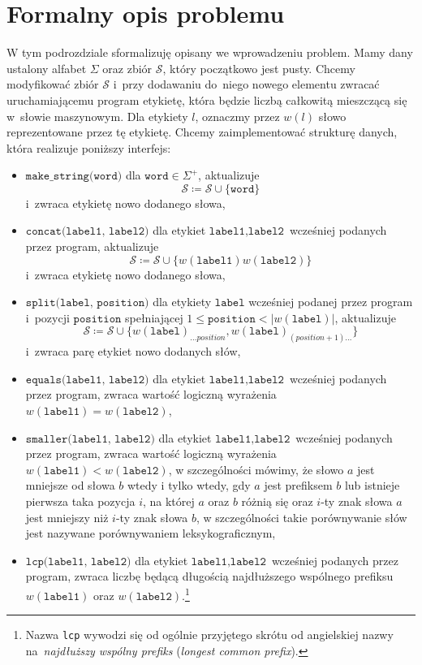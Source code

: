\documentclass[declaration,shortabstract]{iithesis}
\theoremstyle{definition} \newtheorem{definition}{Definicja}[chapter]
\theoremstyle{plain} \newtheorem{remark}[definition]{Obserwacja}
\theoremstyle{plain} \newtheorem{theorem}[definition]{Twierdzenie}
\theoremstyle{plain} \newtheorem{example}{Przykład}[definition]
\theoremstyle{plain} \newtheorem{lemma}[definition]{Lemat}
\begin{document}
\section{Formalny opis problemu}

W tym podrozdziale sformalizuję opisany we wprowadzeniu problem. Mamy dany ustalony alfabet $\Sigma$ oraz zbiór $\mathcal{S}$, który początkowo jest pusty. Chcemy modyfikować zbiór $\mathcal{S}$ i~przy dodawaniu do~niego nowego elementu zwracać uruchamiającemu program etykietę, która będzie liczbą całkowitą mieszczącą się w~słowie maszynowym. Dla etykiety $l$, oznaczmy przez $w(l)$ słowo reprezentowane przez tę etykietę. Chcemy zaimplementować strukturę danych, która realizuje poniższy interfejs:
\begin{itemize}
    \item $\texttt{make\_string(word)}$ dla $\texttt{word} \in \Sigma^+$, aktualizuje $$\mathcal{S} \coloneqq \mathcal{S} \cup \{\texttt{word}\}$$ i~zwraca etykietę nowo dodanego słowa,
    \item $\texttt{concat(label1, label2)}$ dla etykiet $\texttt{label1}, \texttt{label2}$ wcześniej podanych przez program, aktualizuje $$\mathcal{S} \coloneqq \mathcal{S} \cup \{w(\texttt{label1})w(\texttt{label2})\}$$ i~zwraca etykietę nowo dodanego słowa,
    \item $\texttt{split(label, position)}$ dla etykiety $\texttt{label}$ wcześniej podanej przez program i~pozycji $\texttt{position}$ spełniającej $1 \leq \texttt{position} < |w(\texttt{label})|$, aktualizuje $$\mathcal{S} \coloneqq \mathcal{S} \cup \{w(\texttt{label})_{\ldots position}, w(\texttt{label})_{(position+1) \ldots}\}$$ i~zwraca parę etykiet nowo dodanych słów,
    \item $\texttt{equals(label1, label2)}$ dla etykiet $\texttt{label1}, \texttt{label2}$ wcześniej podanych przez program, zwraca wartość logiczną wyrażenia $w(\texttt{label1}) = w(\texttt{label2})$,
    \item $\texttt{smaller(label1, label2)}$ dla etykiet $\texttt{label1}, \texttt{label2}$ wcześniej podanych przez program, zwraca wartość logiczną wyrażenia $w(\texttt{label1}) < w(\texttt{label2})$, w szczególności mówimy, że słowo $a$ jest mniejsze od słowa $b$ wtedy i tylko wtedy, gdy $a$ jest prefiksem $b$ lub istnieje pierwsza taka pozycja $i$, na której $a$ oraz $b$ różnią się oraz $i$-ty znak słowa $a$ jest mniejszy niż $i$-ty znak słowa $b$, w szczególności takie porównywanie słów jest nazywane porównywaniem leksykograficznym,
    \item $\texttt{lcp(label1, label2)}$ dla etykiet $\texttt{label1}, \texttt{label2}$ wcześniej podanych przez program, zwraca liczbę będącą długością najdłuższego wspólnego prefiksu $w(\texttt{label1})$ oraz $w(\texttt{label2})$.\footnote{Nazwa \texttt{lcp} wywodzi się od ogólnie przyjętego skrótu od angielskiej nazwy na~\textit{najdłuższy wspólny prefiks} (\textit{longest common prefix}).}
\end{itemize}
\end{document}
